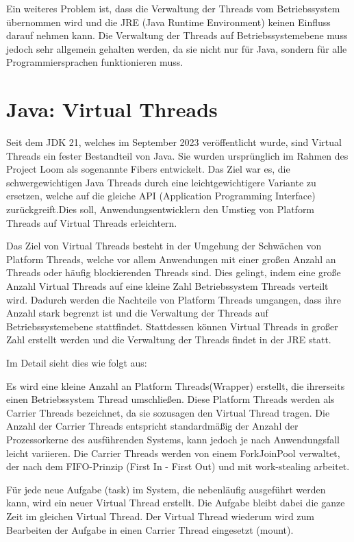 \documentclass[fontsize=12pt,paper=a4,twoside=semi,parskip=half-,headsepline,headinclude]{scrreprt}
\begin{document}
Ein weiteres Problem ist, dass die Verwaltung der Threads vom Betriebssystem über\-nommen wird und die JRE (Java Runtime Environment) keinen Einfluss darauf nehmen kann. Die Verwaltung der Threads auf Betriebssystemebene muss jedoch sehr allgemein gehalten werden, da sie nicht nur für Java, sondern für alle Programmiersprachen funktionieren muss.

\section{Java: Virtual Threads}

Seit dem JDK 21, welches im September 2023 veröffentlicht wurde, sind Virtual Threads ein fester Bestandteil von Java. Sie wurden ursprünglich im Rahmen des Project Loom als sogenannte Fibers entwickelt. Das Ziel war es, die schwergewichtigen Java Threads durch eine leichtgewichtigere Variante zu ersetzen, welche auf die gleiche API (Application Programming Interface) zurückgreift.Dies soll, Anwendungsentwicklern den Umstieg von  Platform Threads auf Virtual Threads erleichtern.

Das Ziel von Virtual Threads besteht in der Umgehung der Schwächen von Platform Threads, welche vor allem Anwendungen mit einer großen Anzahl an Threads oder häufig blockierenden Threads sind. Dies gelingt, indem eine große Anzahl Virtual Threads auf eine kleine Zahl Betriebssystem Threads verteilt wird. Dadurch werden die Nachteile von Platform Threads umgangen, dass ihre Anzahl stark begrenzt ist und die Verwaltung der Threads auf Betriebssystemebene stattfindet. Stattdessen können Virtual Threads in großer Zahl erstellt werden und die Verwaltung der Threads findet in der JRE statt.

Im Detail sieht dies wie folgt aus:

Es wird eine kleine Anzahl an Platform Threads(Wrapper) erstellt, die ihrerseits einen Betriebssystem Thread umschließen. Diese Platform Threads werden als Carrier Threads bezeichnet, da sie sozusagen den Virtual Thread tragen. Die Anzahl der Carrier Threads entspricht standardmäßig der Anzahl der Prozessorkerne des ausführenden Systems, kann jedoch je nach Anwendungsfall leicht variieren. Die Carrier Threads werden von einem ForkJoinPool verwaltet, der nach dem FIFO-Prinzip (First In - First Out) und mit work-stealing arbeitet.\cite{Pressler2023a}

Für jede neue Aufgabe (task) im System, die nebenläufig ausgeführt werden kann, wird ein neuer Virtual Thread erstellt. Die Aufgabe bleibt dabei die ganze Zeit im gleichen Virtual Thread. Der Virtual Thread wiederum wird zum Bearbeiten der Aufgabe in einen Carrier Thread eingesetzt (mount). 
\end{document}
